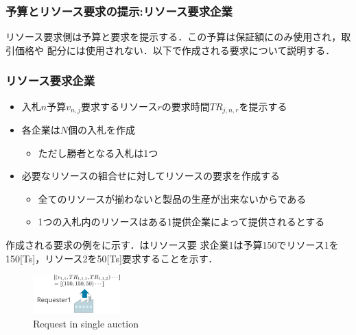 \documentclass{ujarticle}
\begin{document}
\subsubsection{予算とリソース要求の提示:リソース要求企業}
リソース要求側は予算と要求を提示する．この予算は保証額にのみ使用され，取引価格や
配分には使用されない．以下で作成される要求について説明する．
\subsubsection{リソース要求企業}
\begin{itemize}
\item {入札$n$予算$v_{n,j}$要求するリソース$r$の要求時間$TR_{j,n,r}$を提示する} 
\item {各企業は$N$個の入札を作成}
  \begin{itemize}
  \item {ただし勝者となる入札は1つ} 
  \end{itemize}
\item {必要なリソースの組合せに対してリソースの要求を作成する}
    \begin{itemize}
    \item {全てのリソースが揃わないと製品の生産が出来ないからである}
    \item {1つの入札内のリソースはある1提供企業によって提供されるとする}
    \end{itemize}
\end{itemize}
作成される要求の例をに示す．はリソース要
求企業1は予算150でリソース1を150[Ts]，リソース2を50[Ts]要求することを示す．
\begin{figure}[H]
  \centering
  \includegraphics[width=0.3\textwidth]{bid-requester.pdf} 
  \caption{Request in single auction}
  \label{fig:request}
\end{figure}
\end{document}

